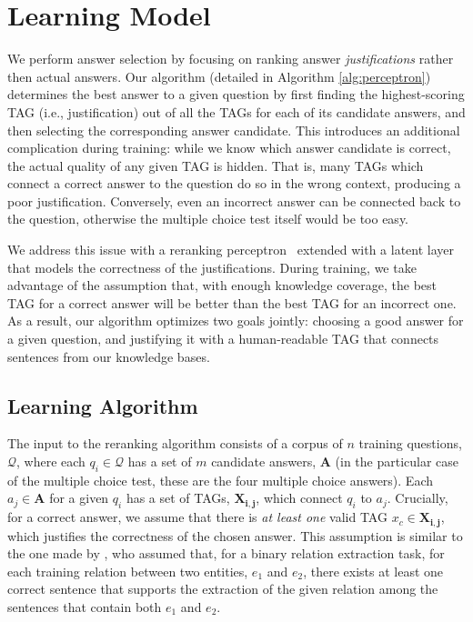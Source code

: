 \section{Learning Model}
\label{sec-cl2017:perceptron}

We perform answer selection by focusing on ranking answer {\em justifications} rather then actual answers. 
Our algorithm (detailed in Algorithm \ref{alg:perceptron}) determines the best answer to a given question by first finding the highest-scoring TAG (i.e., justification) out of all the TAGs for each of its candidate answers, and then selecting the corresponding answer candidate.  
This introduces an additional complication during training: while we know which answer candidate is correct, the actual quality of any given TAG is hidden. That is, many TAGs which connect a correct answer to the question do so in the wrong context, producing a poor justification. Conversely, even an incorrect answer can be connected back to the question, otherwise the multiple choice test itself would be too easy. 

We address this issue with a reranking perceptron~\citep{Shen:Joshi:2005,Surdeanu:11} extended with a latent layer that models the correctness of the justifications. 
During training, we take advantage of the assumption that, with enough knowledge coverage, the best TAG for a correct answer will be better than the best TAG for an incorrect one.  As a result, our algorithm optimizes two goals jointly: choosing a good answer for a given question, and justifying it with a human-readable TAG that connects sentences from our knowledge bases.

\subsection {Learning Algorithm}
\label{sec-cl2017:model}

The input to the reranking algorithm consists of a corpus of $n$ training questions, $\boldsymbol{\mathcal{Q}}$, where each $q_i \in \boldsymbol{\mathcal{Q}}$ has a set of $m$ candidate answers, $\boldsymbol{A}$ (in the particular case of the multiple choice test, these are the four multiple choice answers).  Each $a_j \in \boldsymbol{A}$ for a given $q_i$ has a set of TAGs, $\boldsymbol{X_{i,j}}$, which connect $q_i$ to $a_j$.  
Crucially, for a correct answer, we assume that there is {\em at least one} valid TAG $x_c \in \boldsymbol{X_{i,j}}$, which justifies the correctness of the chosen answer. This assumption is similar to the one made by \citet{hoffmann2011knowledge}, who assumed that, for a binary relation extraction task, for each training relation between two entities, $e_1$ and $e_2$, there exists at least one correct sentence that supports the extraction of the given relation among the sentences that contain both $e_1$ and $e_2$.

